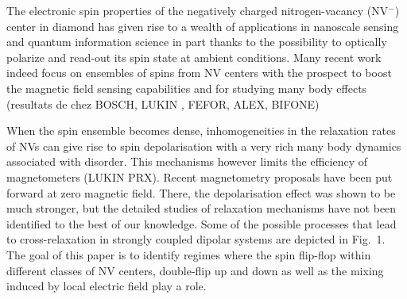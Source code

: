 \documentclass[preprintnumbers,amsmath,amssymb,superscriptaddress,twocolumn,showpacs]{revtex4-2}
\begin{document}
%

The electronic spin properties of the negatively charged nitrogen-vacancy (NV$^-$) center in diamond has given rise to a wealth of applications in nanoscale sensing and quantum information science in part thanks to the possibility to optically polarize and read-out its spin state at ambient conditions. Many recent work indeed focus on ensembles of spins from NV centers with the prospect to boost the magnetic field sensing capabilities and for studying many body effects (resultats de chez BOSCH, LUKIN , FEFOR, ALEX, BIFONE)

When the spin ensemble becomes dense, inhomogeneities in the relaxation rates of NVs can give rise to spin depolarisation with a very rich many body dynamics associated with disorder. This mechanisms however limits the efficiency of magnetometers (LUKIN PRX).
Recent magnetometry proposals have been put forward at zero magnetic field. There, the depolarisation effect was shown to be much stronger, but the detailed studies of relaxation mechanisms have not been identified to the best of our knowledge. Some of the possible processes that lead to cross-relaxation in strongly coupled dipolar systems are depicted in Fig.~1. The goal of this paper is to identify regimes where the spin flip-flop within different classes of NV centers, double-flip up and down as well as the mixing induced by local electric field play a role. 
\end{document}
